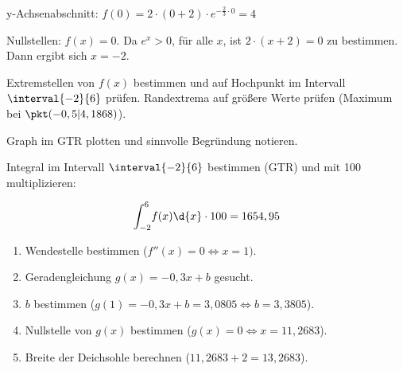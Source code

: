 \documentclass[11pt, a5paper, landscape, final]{scrartcl}
\begin{document}
	\begin{loesung}
		\begin{enumeratea}
			\item y-Achsenabschnitt: $f(0) = 2\cdot (0+2)\cdot e^{-\tfrac{2}{3}\cdot 0} = 4$
			
			Nullstellen: $f(x) = 0$. Da $e^x>0$, für alle $x$, ist $2\cdot (x+2) = 0$ zu bestimmen. Dann ergibt sich $x = -2$.
			
			\item Extremstellen von $f(x)$ bestimmen und auf Hochpunkt im Intervall $\interval{-2}{6}$ prüfen.  Randextrema auf größere Werte prüfen (Maximum bei $\pkt(-0,5|4,1868)$).
			
			\item Graph im GTR plotten und sinnvolle Begründung notieren.
			
			\item Integral im Intervall $\interval{-2}{6}$ bestimmen (GTR) und mit 100 multiplizieren:
			
			\[ \int_{-2}^6\!f(x)\d{x}\cdot 100 = 1654,95 \]
			
			\item\begin{enumerate}
				\item Wendestelle bestimmen ($f''(x) = 0 \Leftrightarrow x = 1)$.
				\item Geradengleichung $g(x) = -0,3x + b$ gesucht.
				\item $b$ bestimmen ($g(1) = -0,3x + b = 3,0805\Leftrightarrow b = 3,3805$).
				\item Nullstelle von $g(x)$ bestimmen ($g(x) = 0\Leftrightarrow x = 11,2683$).
				\item Breite der Deichsohle berechnen ($11,2683 + 2 = 13,2683$).
			\end{enumerate}
		\end{enumeratea}
		\clearpage
	\end{loesung}
	
\end{document}
